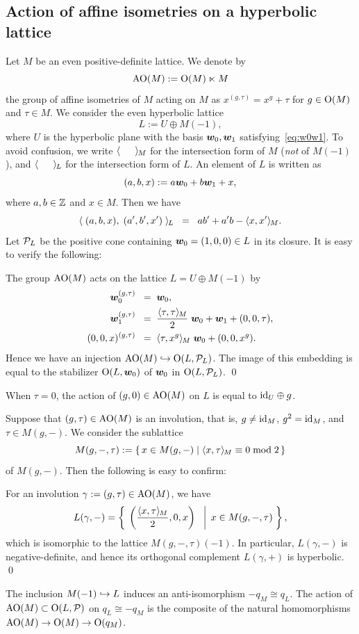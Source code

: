 \documentclass{amsart} %
\begin{document}
\subsection{Action of affine isometries on a hyperbolic lattice}\label{subsec:AOGM}
%
Let $M$ be an even positive-definite lattice.
We denote by 
\[
\mathord{\mathrm{AO}}(M):=\mathord{\mathrm{O}}(M)\ltimes M
\]
 the group of affine isometries of $M$
acting on $M$ as $x^{(g, \tau)}=x^g+\tau$
for $g\in \mathord{\mathrm{O}}(M)$ and $\tau\in M$.
We consider the even hyperbolic lattice
\[
L:=U\oplus M(-1),
\]
where $U$ is the hyperbolic plane with the basis $\boldsymbol{w}_0, \boldsymbol{w}_1$
satisfying~\eqref{eq:w0w1}.
To avoid confusion, we write $\langle \phantom{a,a} \rangle_{\hskip -1pt M}$
for the intersection form of $M$ (\emph{not} of $M(-1)$),
and $\langle \phantom{a,a} \rangle_{\hskip -1pt L}$
for the intersection form of $L$.
An element of $L$ is written as 
\[
(a, b, x):=a\boldsymbol{w}_0+b \boldsymbol{w}_1+ x,
\]
where $a, b\in \mathord{\mathbb{Z}}$ and $x\in M$.
Then we have
\[
\langle \; (a, b, x), \; (a^{\prime}, b^{\prime}, x^{\prime})\; \rangle_{\hskip -1pt L}\;\;=\;\; ab^{\prime}+a^{\prime} b-\langle x, x^{\prime} \rangle_{\hskip -1pt M}.
\]
Let $\mathord{\mathcal{P}}_L$ be the positive cone containing 
$\boldsymbol{w}_0=(1,0, 0)\in L$ in its closure.
It is easy to verify the following:
%
\begin{proposition}\label{prop:embeddingAOG}
The group $\mathord{\mathrm{AO}}(M)$ acts on the lattice $L=U\oplus M(-1)$
by
%
\begin{align*}
\boldsymbol{w}_0^{(g, \tau)} \;\;=\;\; & \boldsymbol{w}_0, \\
\boldsymbol{w}_1^{(g, \tau)} \;\;=\;\; & \frac{\langle \tau, \tau \rangle_{\hskip -1pt M}}{2}\;\boldsymbol{w}_0+\boldsymbol{w}_1+(0,0,\tau), \\
(0,0,x)^{(g, \tau)} \;\;=\;\; &\langle \tau, x^g \rangle_{\hskip -1pt M} \;\boldsymbol{w}_0 + (0,0, x^g).
\end{align*}
Hence we have an injection $\mathord{\mathrm{AO}}(M)\hookrightarrow \mathord{\mathrm{O}}(L, \mathord{\mathcal{P}}_L)$.
The image of this embedding is equal to
the stabilizer $\mathord{\mathrm{O}}(L, \boldsymbol{w}_0)$ of $\boldsymbol{w}_0$ in $\mathord{\mathrm{O}}(L, \mathord{\mathcal{P}}_L)$.
\qed
%
\end{proposition}
%
\begin{remark}\label{rem:tau0}
When $\tau=0$, the action of $(g, 0)\in \mathord{\mathrm{AO}}(M)$ on $L$ 
is equal to $\mathord{\mathrm{id}}_U\oplus g$.
\end{remark}
%
Suppose that $(g, \tau)\in \mathord{\mathrm{AO}}(M)$ is an involution, 
that is, $g\ne \mathord{\mathrm{id}}_M$, $g^2=\mathord{\mathrm{id}}_M$, and $\tau\in M(g, -)$.
We consider the sublattice 
\[
M(g, -,\tau):=\{\,{x\in M(g, -)}\mid {\langle x, \tau \rangle_{\hskip -1pt M}\equiv 0 \bmod 2} \,\}
\]
of $M(g, -)$.
Then the following is easy to confirm:
%
\begin{proposition}\label{prop:involL}
For an involution $\gamma:=(g, \tau)\in \mathord{\mathrm{AO}}(M)$, we have 
\[
L(\gamma, -)=\left\{\; \left. {\left(\frac{\langle x, \tau \rangle_{\hskip -1pt M}}{2}, 0, x\right)\;\;} \; \right\vert \; {x \in M(g, -,\tau)} \; \right \},
\]
which is isomorphic to 
the lattice $M(g, -,\tau)(-1)$.
In particular, 
$L(\gamma, -)$ is negative-definite, and 
hence its orthogonal complement $L(\gamma, +)$ is hyperbolic.
\qed
\end{proposition}
%
\begin{remark}
The inclusion $M(-1)\hookrightarrow L$ induces an anti-isomorphism $-q_M\cong q_L$.
The action of $\mathord{\mathrm{AO}}(M)\subset \mathord{\mathrm{O}}(L, \mathord{\mathcal{P}})$ on $q_L\cong -q_M$ 
is the composite of the natural homomorphisms $\mathord{\mathrm{AO}}(M) \to \mathord{\mathrm{O}}(M)\to \mathord{\mathrm{O}}(q_M)$.
\end{remark}
%
\end{document}
